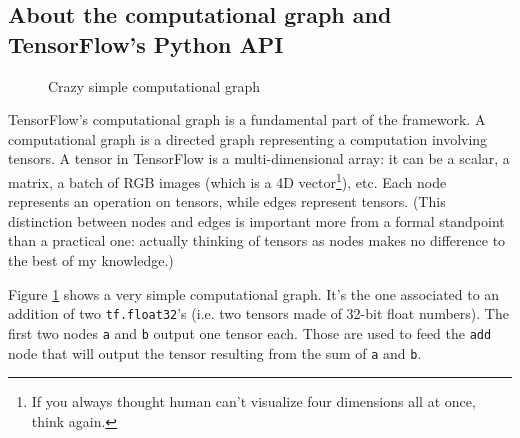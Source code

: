 \subsection{About the computational graph and TensorFlow's Python API}
\label{subsec:computational-graph}

\begin{figure}
  \centering
  \caption[]{Crazy simple computational graph}
  \label{fig:easy-graph}
\end{figure}

TensorFlow's computational graph is a fundamental part of the
framework. A computational graph is a directed graph representing a
computation involving tensors. A tensor in TensorFlow is a
multi-dimensional array: it can be a scalar, a matrix, a batch of RGB
images (which is a 4D vector\footnote{If you always thought human can't
  visualize four dimensions all at once, think again.}), etc. Each node
represents an operation on tensors, while edges represent tensors.
(This distinction between nodes and edges is important more from a
formal standpoint than a practical one: actually thinking of tensors as
nodes makes no difference to the best of my knowledge.)

Figure \ref{fig:easy-graph} shows a very simple computational graph.
It's the one associated to an addition of two \texttt{tf.float32}'s
(i.e. two tensors made of 32-bit float numbers). The first two nodes
\texttt{a} and \texttt{b} output one tensor each. Those are used to
feed the \texttt{add} node that will output the tensor resulting from
the sum of \texttt{a} and \texttt{b}.

